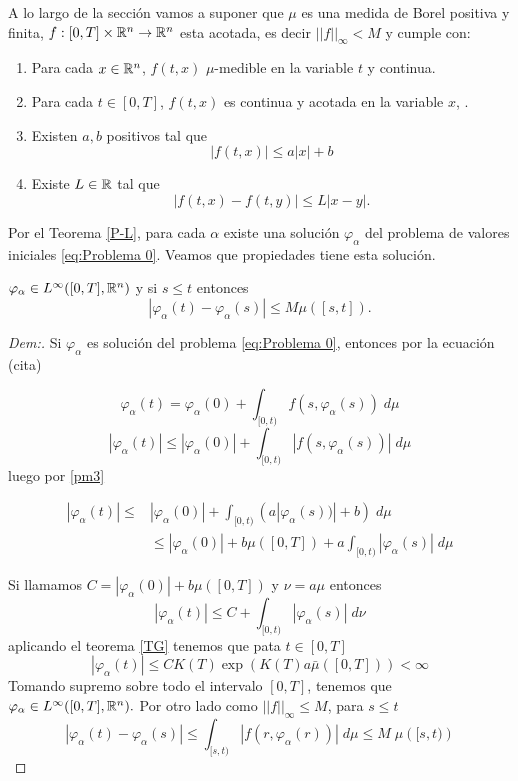 A lo largo de la sección vamos a suponer que $ \mu$ es una medida de Borel positiva y finita, $f:[0,T]\times\mathbb{R}^n\to\mathbb{R}^n$ esta acotada, es decir $||f||_\infty<M$ y cumple con:
 \begin{enumerate}[label=\upshape(P-\arabic*),ref= (P-\arabic*)]
 	\item \label{pm1} Para cada $x\in\mathbb{R}^n$, $f(t,x)$  $\mu$-medible en la variable $t$ y continua.
 	\item \label{pm2} Para cada $t\in[0,T]$, $f(t,x)$ es continua y acotada en la variable $x$, .
 	\item \label{pm3} Existen $a,b$ positivos tal que
 	$$|f(t,x)|\leq a|x|+b$$ 
 	\item \label{pm4}Existe $L\in\mathbb{R}$ tal que $$\left| f(t,x)-f(t,y)\right|\leq L\left| x-y \right| . $$
 \end{enumerate} 
 Por el Teorema \ref{P-L}, para cada $\alpha$ existe una solución $\varphi_\alpha$ del problema de valores iniciales \ref{eq:Problema 0}. Veamos que propiedades tiene esta solución.
\begin{prop}
    $\varphi_{\alpha}\in L^\infty([0,T],\mathbb{R}^n)$ y si $s\leq t$ entonces
    \begin{equation}\label{acotación}
        \left| \varphi_\alpha(t)-\varphi_\alpha(s)\right|\leq M\mu([s,t]).
    \end{equation}
\end{prop}
\begin{proof}[Dem:]
 	Si $\varphi_{\alpha}$ es solución del problema \ref{eq:Problema 0}, entonces por la ecuación (cita)

 		$$\varphi_{\alpha}(t)=\varphi_{\alpha}(0)+\int_{[0,t)} f(s,\varphi_{\alpha}(s))\;d\mu$$
$$ 		|\varphi_{\alpha}(t)| \leq |\varphi_{\alpha}(0)|+\int_{[0,t)}| f(s,\varphi_{\alpha}(s))|\;d\mu$$
luego por \ref{pm3}

\begin{equation*}
\begin{split}
 	|\varphi_{\alpha}(t)| \leq & |\varphi_{\alpha}(0)|+\int_{[0,t)}\left(a|\varphi_{\alpha}(s))|+b\right)\;d\mu\\	
     &\leq |\varphi_{\alpha}(0)|+b\mu([0,T])+a\int_{[0,t)}| \varphi_{\alpha}(s)|\;d\mu
\end{split}
\end{equation*}

 Si llamamos $C=|\varphi_{\alpha}(0)|+b\mu([0,T])$ y $\nu=a\mu$ entonces
 $$|\varphi_{\alpha}(t)| \leq C+\int_{[0,t)}| \varphi_{\alpha}(s)|\;d\nu$$
 aplicando el teorema \ref{TG} tenemos que pata $t\in[0,T]$
 \begin{equation*}
 	|\varphi_{\alpha}(t)|\leq CK(T)\exp\left(K(T)a\bar{\mu}([0,T]) \right)  < \infty
 \end{equation*}
Tomando supremo sobre todo el intervalo $[0,T]$, tenemos que\\ 
$\varphi_{\alpha}\in L^\infty([0,T],\mathbb{R}^n).$
Por otro lado como $||f||_\infty \leq M$, para $s\leq t$
  	\begin{equation*}
  		|\varphi_\alpha(t)-\varphi_\alpha(s)|\leq \int_{[s,t)}|f(r,\varphi_\alpha(r))|\;d\mu\leq M\;\mu\left( [s,t) \right) 
  	\end{equation*}
\end{proof}
